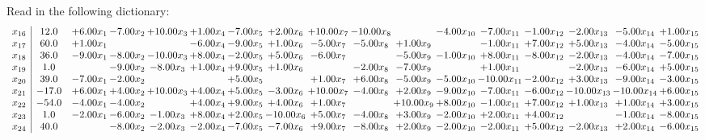 \documentclass[9pt]{article}
\begin{document}
Read in the following dictionary:
\[\begin{array}{c| c c@{\hskip 2pt} c@{\hskip 2pt} c@{\hskip 2pt} c@{\hskip 2pt} c@{\hskip 2pt} c@{\hskip 2pt} c@{\hskip 2pt} c@{\hskip 2pt} c@{\hskip 2pt} c@{\hskip 2pt} c@{\hskip 2pt} c@{\hskip 2pt} c@{\hskip 2pt} c@{\hskip 2pt} c@{\hskip 2pt} }
 x_{16}   &  12.0 & +  6.00 x_{1} & -7.00 x_{2} & + 10.00 x_{3} & +  1.00 x_{4} & -7.00 x_{5} & +  2.00 x_{6} & + 10.00 x_{7} & -10.00 x_{8} &   & -4.00 x_{10} & -7.00 x_{11} & -1.00 x_{12} & -2.00 x_{13} & -5.00 x_{14} & +  1.00 x_{15}\\
 x_{17}   &  60.0 & +  1.00 x_{1} &    &   & -6.00 x_{4} & -9.00 x_{5} & +  1.00 x_{6} & -5.00 x_{7} & -5.00 x_{8} & +  1.00 x_{9} &   & -1.00 x_{11} & +  7.00 x_{12} & +  5.00 x_{13} & -4.00 x_{14} & -5.00 x_{15}\\
 x_{18}   &  36.0 & -9.00 x_{1} & -8.00 x_{2} & -10.00 x_{3} & +  8.00 x_{4} & -2.00 x_{5} & +  5.00 x_{6} & -6.00 x_{7} &   & -5.00 x_{9} & -1.00 x_{10} & +  8.00 x_{11} & -8.00 x_{12} & -2.00 x_{13} & -4.00 x_{14} & -7.00 x_{15}\\
 x_{19}   &  1.0  &   & -9.00 x_{2} & -8.00 x_{3} & +  1.00 x_{4} & +  9.00 x_{5} & +  1.00 x_{6} &   & -2.00 x_{8} & -7.00 x_{9} &   & +  1.00 x_{11} &   & -2.00 x_{13} & -6.00 x_{14} & +  5.00 x_{15}\\
 x_{20}   &  39.0 & -7.00 x_{1} & -2.00 x_{2} &    &   & +  5.00 x_{5} &   & +  1.00 x_{7} & +  6.00 x_{8} & -5.00 x_{9} & -5.00 x_{10} & -10.00 x_{11} & -2.00 x_{12} & +  3.00 x_{13} & -9.00 x_{14} & -3.00 x_{15}\\
 x_{21}   &  -17.0 & +  6.00 x_{1} & +  4.00 x_{2} & + 10.00 x_{3} & +  4.00 x_{4} & +  5.00 x_{5} & -3.00 x_{6} & + 10.00 x_{7} & -4.00 x_{8} & +  2.00 x_{9} & -9.00 x_{10} & -7.00 x_{11} & -6.00 x_{12} & -10.00 x_{13} & -10.00 x_{14} & +  6.00 x_{15}\\
 x_{22}   &  -54.0 & -4.00 x_{1} & -4.00 x_{2} &   & +  4.00 x_{4} & +  9.00 x_{5} & +  4.00 x_{6} & +  1.00 x_{7} &   & + 10.00 x_{9} & +  8.00 x_{10} & -1.00 x_{11} & +  7.00 x_{12} & +  1.00 x_{13} & +  1.00 x_{14} & +  3.00 x_{15}\\
 x_{23}   &  1.0 & -2.00 x_{1} & -6.00 x_{2} & -1.00 x_{3} & +  8.00 x_{4} & +  2.00 x_{5} & -10.00 x_{6} & +  5.00 x_{7} & -4.00 x_{8} & +  3.00 x_{9} & -2.00 x_{10} & +  2.00 x_{11} & +  4.00 x_{12} &   & -1.00 x_{14} & -8.00 x_{15}\\
 x_{24}   &  40.0  &   & -8.00 x_{2} & -2.00 x_{3} & -2.00 x_{4} & -7.00 x_{5} & -7.00 x_{6} & +  9.00 x_{7} & -8.00 x_{8} & +  2.00 x_{9} & -2.00 x_{10} & -2.00 x_{11} & +  5.00 x_{12} & -2.00 x_{13} & +  2.00 x_{14} & -6.00 x_{15}\\

\end{array}\]
\end{document}
